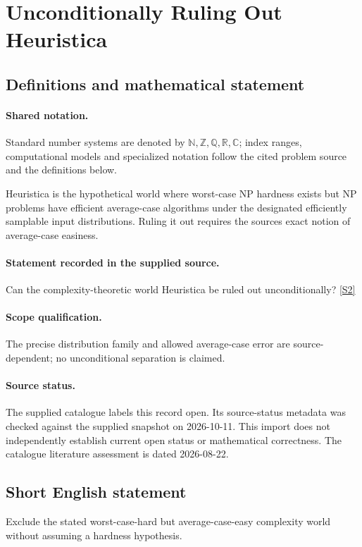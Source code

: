 \documentclass[11pt]{article}
\newcommand{\sref}[2]{\hyperlink{source:#1:#2}{[S#2]}}
\begin{document}
\section{Unconditionally Ruling Out Heuristica}\label{statement}

\subsection{Definitions and mathematical statement}

\paragraph{Shared notation.}Standard number systems are denoted by $\mathbb N,\mathbb Z,\mathbb Q,\mathbb R,\mathbb C$; index ranges, computational models and specialized notation follow the cited problem source and the definitions below.


Heuristica is the hypothetical world where worst-case NP hardness exists but NP problems have efficient average-case algorithms under the designated efficiently samplable input distributions. Ruling it out requires the source\textquotesingle s exact notion of average-case easiness.
\paragraph{Statement recorded in the supplied source.}
Can the complexity-theoretic world Heuristica be ruled out unconditionally? \sref{statement}{2}
\paragraph{Scope qualification.}
The precise distribution family and allowed average-case error are source-dependent; no unconditional separation is claimed.
\paragraph{Source status.}
The supplied catalogue labels this record open. Its source-status metadata was checked against the supplied snapshot on 2026-10-11. This import does not independently establish current open status or mathematical correctness. The catalogue literature assessment is dated 2026-08-22.
\subsection{Short English statement}
Exclude the stated worst-case-hard but average-case-easy complexity world without assuming a hardness hypothesis.
\end{document}
